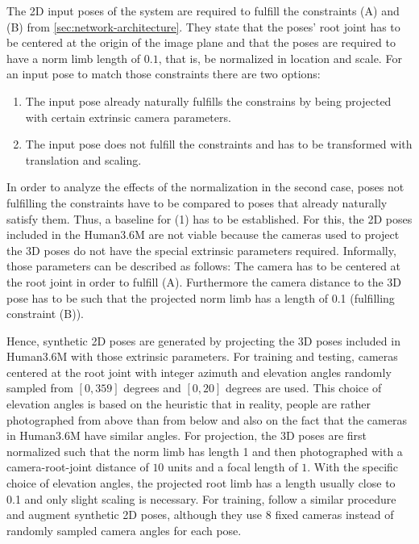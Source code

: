 The 2D input poses of the system are required to fulfill the constraints (A) and (B) from \autoref{sec:network-architecture}. 
They state that the poses' root joint has to be centered at the origin of the image plane and that the poses are required to have a norm limb length of $0.1$, that is, be normalized in location and scale.
For an input pose to match those constraints there are two options:
\begin{enumerate}
	\item The input pose already naturally fulfills the constrains by being projected with certain extrinsic camera parameters.
	\item The input pose does not fulfill the constraints and has to be transformed with translation and scaling.
\end{enumerate}
In order to analyze the effects of the normalization in the second case, poses not fulfilling the constraints have to be compared to poses that already naturally satisfy them.
Thus, a baseline for (1) has to be established.
For this, the 2D poses included in the Human3.6M are not viable because the cameras used to project the 3D poses do not have the special extrinsic parameters required.
Informally, those parameters can be described as follows:
The camera has to be centered at the root joint in order to fulfill (A). 
Furthermore the camera distance to the 3D pose has to be such that the projected norm limb has a length of 0.1 (fulfilling constraint (B)).

Hence, synthetic 2D poses are generated by projecting the 3D poses included in Human3.6M with those extrinsic parameters.
For training and testing, cameras centered at the root joint with integer azimuth and elevation angles randomly sampled from $[0, 359]$ degrees and $[0, 20]$ degrees are used.
This choice of elevation angles is based on the heuristic that in reality, people are rather photographed from above than from below and also on the fact that the cameras in Human3.6M have similar angles.
For projection, the 3D poses are first normalized such that the norm limb has length 1 and then photographed with a camera-root-joint distance of $10$ units and a focal length of $1$.
With the specific choice of elevation angles, the projected root limb has a length usually close to 0.1 and only slight scaling is necessary.
For training, \citet{drover18} follow a similar procedure and augment synthetic 2D poses, although they use 8 fixed cameras instead of randomly sampled camera angles for each pose.





